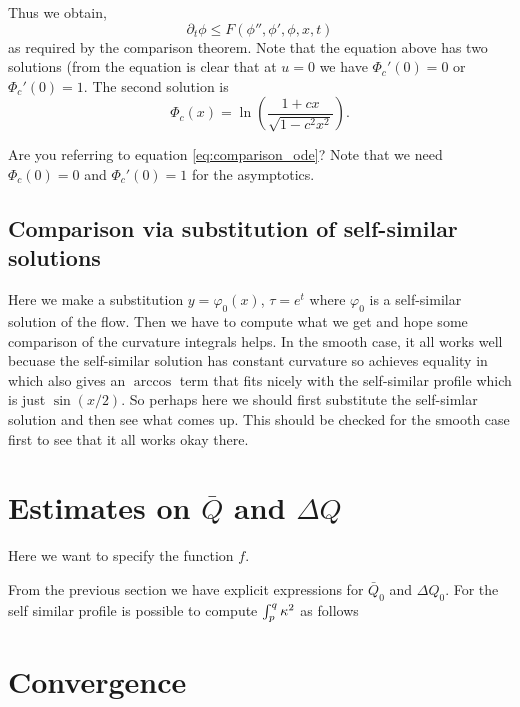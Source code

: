 \documentclass[11pt]{amsart}
\begin{document}
Thus we obtain,
\[
\partial_t \phi \leq F(\phi'', \phi', \phi, x, t)
\]
as required by the comparison theorem.
{\color{red} Note that the equation above has two solutions (from the equation is clear that at $u=0$ we have $\Phi_c'(0)=0$ or $\Phi_c'(0)=1$. The second solution is 
$$\Phi_c(x)=\ln\left(\frac{1+cx}{\sqrt{1-c^2x^2}}\right).$$}

{\color{blue}Are you referring to equation \eqref{eq:comparison_ode}? Note that we need $\Phi_c(0) = 0$ and $\Phi_c'(0) = 1$ for the asymptotics.}

\subsection{Comparison via substitution of self-similar solutions}

Here we make a substitution $y = \varphi_0 (x)$, $\tau = e^t$ where $\varphi_0$ is a self-similar solution of the flow. Then we have to compute what we get and hope some comparison of the curvature integrals helps. In the smooth case, it all works well becuase the self-similar solution has constant curvature so achieves equality in \holder{} which also gives an $\arccos$ term that fits nicely with the self-similar profile which is just $\sin(x/2)$. So perhaps here we should first substitute the self-simlar solution and then see what comes up. This should be checked for the smooth case first to see that it all works okay there.
\section{Estimates on $\bar{Q}$ and $\Delta Q$}
Here we want to specify the function $f$.

From the previous section we have explicit expressions for $\bar{Q}_0$ and $\Delta Q_0$. For the self similar profile is possible to compute $\int_p^q \operatorname{\kappa}^2$ as follows



\section{Convergence}
\label{sec:orgheadline12}
\end{document}
